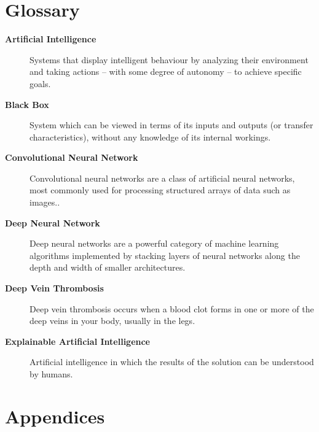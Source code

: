 \chapter*{Glossary}
\begin{description}
    \item [\textbf{Artificial Intelligence}] Systems that display intelligent behaviour by analyzing their environment and taking actions – with some degree of autonomy – to achieve specific goals.
    \item [\textbf{Black Box}] System which can be viewed in terms of its inputs and outputs (or transfer characteristics), without any knowledge of its internal workings.
    \item [\textbf{Convolutional Neural Network}] Convolutional neural networks are a class of artificial neural networks, most commonly used for processing structured arrays of data such as images..
    \item [\textbf{Deep Neural Network}] Deep neural networks are a powerful category of machine learning algorithms implemented by stacking layers of neural networks along the depth and width of smaller architectures.
    \item [\textbf{Deep Vein Thrombosis}] Deep vein thrombosis occurs when a blood clot forms in one or more of the deep veins in your body, usually in the legs.
    \item [\textbf{Explainable Artificial Intelligence}] Artificial intelligence in which the results of the solution can be understood by humans.
\end{description}
\clearpage

{}
\chapter*{Appendices}
\begin{comment}
Zusätzliche Informationen die zu lang für die Arbeit sind können hier verfügbar gemacht werden.

Aber auch an die DVD denken — was ist dort besser aufgehoben? Die Zeiten, in denen man Programmcode manuell eingetippt hat, sind ja glücklicherweise lange vorbei, deswegen macht Code hier wenig Sinn.

Ist entsprechend ein Priorisierung: Was würde sich der Leser vielleicht gerne während des Lesens der Arbeit (z. B. im Zug) ansehen, wenn er auch gerade nicht auf die DVD zugreifen kann (kein DVD Laufwerk)?

Inhalte sind oft: Überblick der Inhalte der DVD, Fragebögen (falls digital Screenshots oder neu für den Druck formatiert), Interviewleitfäden, etc. Selten detailliertere Evaluationsergebnisse.

Hier kurz die Zwischenüberschriften nennen und evtl. 1 Satz, was dort zu finden ist (falls es nicht schon durch die Zwischenüberschrift klar ist). 
\end{comment}

